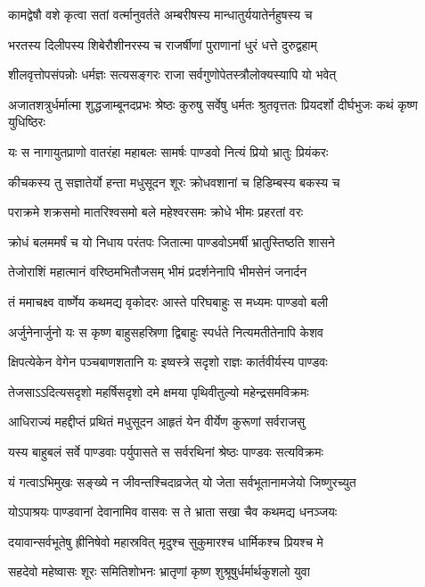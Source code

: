 \twolineshloka
{कामद्वेषौ वशे कृत्वा सतां वर्त्मानुवर्तते}
{अम्बरीषस्य मान्धातुर्ययातेर्नहुषस्य च}


\twolineshloka
{भरतस्य दिलीपस्य शिबेरौशीनरस्य च}
{राजर्षीणां पुराणानां धुरं धत्ते दुरुद्वहाम्}


\twolineshloka
{शीलवृत्तोपसंपन्नोः धर्मज्ञः सत्यसङ्गरः}
{राजा सर्वगुणोपेतस्त्रौलोक्यस्यापि यो भवेत्}


\threelineshloka
{अजातशत्रुर्धर्मात्मा शुद्धजाम्बूनदप्रभः}
{श्रेष्ठः कुरुषु सर्वेषु धर्मतः श्रुतवृत्ततः}
{प्रियदर्शो दीर्घभुजः कथं कृष्ण युधिष्ठिरः}


\twolineshloka
{यः स नागायुतप्राणो वातरंहा महाबलः}
{सामर्षः पाण्डवो नित्यं प्रियो भ्रातुः प्रियंकरः}


\twolineshloka
{कीचकस्य तु सज्ञातेर्यो हन्ता मधुसूदन}
{शूरः क्रोधवशानां च हिडिम्बस्य बकस्य च}


\twolineshloka
{पराक्रमे शक्रसमो मातरिश्वसमो बले}
{महेश्वरसमः क्रोधे भीमः प्रहरतां वरः}


\twolineshloka
{क्रोधं बलममर्षं च यो निधाय परंतपः}
{जितात्मा पाण्डवोऽमर्षी भ्रातुस्तिष्ठति शासने}


\twolineshloka
{तेजोराशिं महात्मानं वरिष्ठमभितौजसम्}
{भीमं प्रदर्शनेनापि भीमसेनं जनार्दन}


\twolineshloka
{तं ममाचक्ष्व वार्ष्णेय कथमद्य वृकोदरः}
{आस्ते परिघबाहुः स मध्यमः पाण्डवो बली}


\twolineshloka
{अर्जुनेनार्जुनो यः स कृष्ण बाहुसहस्रिणा}
{द्विबाहुः स्पर्धते नित्यमतीतेनापि केशव}


\twolineshloka
{क्षिपत्येकेन वेगेन पञ्चबाणशतानि यः}
{इष्वस्त्रे सदृशो राज्ञः कार्तवीर्यस्य पाण्डवः}


\twolineshloka
{तेजसाऽऽदित्यसदृशो महर्षिसदृशो दमे}
{क्षमया पृथिवीतुल्यो महेन्द्रसमविक्रमः}


\twolineshloka
{आधिराज्यं महद्दीप्तं प्रथितं मधुसूदन}
{आहृतं येन वीर्येण कुरूणां सर्वराजसु}


\twolineshloka
{यस्य बाहुबलं सर्वे पाण्डवाः पर्युपासते}
{स सर्वरथिनां श्रेष्ठः पाण्डवः सत्यविक्रमः}


\twolineshloka
{यं गत्वाऽभिमुखः सङ्ख्ये न जीवन्तश्चिदाव्रजेत्}
{यो जेता सर्वभूतानामजेयो जिष्णुरच्युत}


\twolineshloka
{योऽपाश्रयः पाण्डवानां देवानामिव वासवः}
{स ते भ्राता सखा चैव कथमद्य धनञ्जयः}


\twolineshloka
{दयावान्सर्वभूतेषु ह्रीनिषेवो महास्रवित्}
{मृदुश्च सुकुमारश्च धार्मिकश्च प्रियश्च मे}


\twolineshloka
{सहदेवो महेष्वासः शूरः समितिशोभनः}
{भ्रातृणां कृष्ण शुश्रूषुर्धर्मार्थकुशलो युवा}


